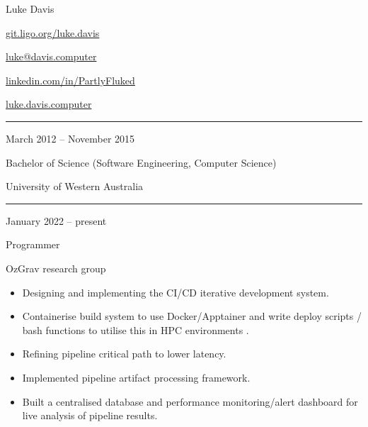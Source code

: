 \documentclass[a4paper,9pt]{article}
\newlength{\cvcolumngapwidth}
\newlength{\cvleftcolumnwidth}
\newlength{\cvrightcolumnwidth}
\newcommand{\cvnamestyle}[1]{{\Large\cvnamefont\textcolor{cvnamecolor}{#1}}}
\newcommand{\cvsectionstyle}[1]{{\normalsize\cvsectionfont\textcolor{cvsectioncolor}{#1}}}
\newcommand{\cvtitlestyle}[1]{{\large\cvtitlefont\textcolor{cvtitlecolor}{#1}}}
\newcommand{\cvdurationstyle}[1]{{\small\cvdurationfont\textcolor{cvdurationcolor}{#1}}}
\newlength{\cvafteritemskipamount}
\newlength{\cvaftersectionskipamount}
\newlength{\cvafternameskipamount}
\newlength{\cvafterpersonalinfolineskipamount}
\newlength{\cvaftertitleskipamount}
\newlength{\cvparskip}
\newcommand{\cvpersonalinfo}[2]{
    \begin{minipage}[t]{\cvleftcolumnwidth}
        \vspace{0mm} %
        \raggedleft #1
    \end{minipage}%
    \hspace{\cvcolumngapwidth}%
    \begin{minipage}[t]{\cvrightcolumnwidth}
        \vspace{0mm} %
        #2
    \end{minipage}

    \vspace{\cvafteritemskipamount}
}
\newcommand{\cvname}[1]{
    \cvnamestyle{#1}

    \vspace{\cvafternameskipamount}
}
\newcommand{\cvpersonalinfolinewithicon}[3]{
    \raisebox{.5\fontcharht\font`E-.5\height}{\texttt{[image: \#2]}}
    #3

    \vspace{\cvafterpersonalinfolineskipamount}
}
\newcommand{\cvsection}[1]{
    \begin{minipage}[t]{\cvleftcolumnwidth}
        \raggedleft\cvsectionstyle{#1}
    \end{minipage}%
    \hspace{\cvcolumngapwidth}%
    \begin{minipage}[t]{\cvrightcolumnwidth}
        \textcolor{cvrulecolor}{\rule{\cvrightcolumnwidth}{0.3mm}}
    \end{minipage}

    \vspace{\cvaftersectionskipamount}
}
\newcommand{\cvitem}[2]{
    \begin{minipage}[t]{\cvleftcolumnwidth}
        \raggedleft #1
    \end{minipage}%
    \hspace{\cvcolumngapwidth}%
    \begin{minipage}[t]{\cvrightcolumnwidth}
        \setlength{\parskip}{\cvparskip} #2
    \end{minipage}

    \vspace{\cvafteritemskipamount}
}
\newcommand{\cvtitle}[1]{
    \cvtitlestyle{#1}

    \vspace{\cvaftertitleskipamount}
    \vspace{-\cvparskip}
}
\begin{document}

\cvpersonalinfo{
    \cvname{Luke Davis}


    \cvpersonalinfolinewithicon{height=5mm}{GitHub-Mark-32px.png}{
        \href{https://git.ligo.org/luke.davis}{git.ligo.org/luke.davis}
    }

    \cvpersonalinfolinewithicon{height=5mm}{070-envelop.pdf}{
        \href{mailto:luke@davis.computer}{luke@davis.computer}
    }
}{
    
    \vspace{7.6mm plus 1.25mm minus 1.25mm}

    \cvpersonalinfolinewithicon{height=5mm}{458-linkedin.pdf}{
        \href{https://linkedin.com/in/PartlyFluked}{linkedin.com/in/PartlyFluked}
    }

    \cvpersonalinfolinewithicon{height=5mm}{website-icon.png}{
        \href{https://luke.davis.computer}{luke.davis.computer}
    }
}


\cvsection{EDUCATION}

\cvitem{
    \cvdurationstyle{March 2012 -- November 2015}
}{
    \cvtitle{Bachelor of Science (Software Engineering, Computer Science)}

    University of Western Australia
}


\cvsection{WORK EXPERIENCE}

\cvitem{
    \cvdurationstyle{January 2022 -- present}
}{
    \cvtitle{Programmer}

    OzGrav research group

    \begin{itemize}[leftmargin=*]
        \item Designing and implementing the CI/CD iterative development system.
        \item Containerise build system to use Docker/Apptainer and write deploy scripts / bash functions to utilise this in HPC environments .
        \item Refining pipeline critical path to lower latency.
        \item Implemented pipeline artifact processing framework.
        \item Built a centralised database and performance monitoring/alert dashboard for live analysis of pipeline results.
    \end{itemize}
}
\end{document}
